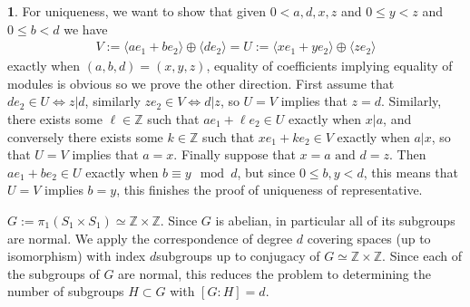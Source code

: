 \documentclass[10.5pt]{article}
\theoremstyle{definition}
\newtheorem{pb}{}
\newcommand{\gen}[1]{\langle #1 \rangle}
\newcommand{\tand}{\text{ and }}
\begin{document}
\begin{pb}
        For uniqueness, we want to show that given \(0 < a,d,x,z\) and \(0 \leq y < z\) and \(0 \leq b < d\) we have
        \begin{align*}
            V := \gen{ae_1 + be_2}\oplus\gen{de_2} = U := \gen{xe_1 + ye_2}\oplus\gen{ze_2}
        \end{align*}
        exactly when \((a,b,d) = (x,y,z)\), equality of coefficients implying equality of modules is obvious so we prove the other direction. First assume that \(d e_2 \in U \iff z \vert d\), similarly \(z e_2 \in V \iff d \vert z\), so \(U = V\) implies that \(z = d\). Similarly, there exists some \(\ell \in \mathbb{Z}\) such that \(ae_1 + \ell e_2 \in U\) exactly when \(x \vert a\), and conversely there exists some \(k \in \mathbb{Z}\) such that \(xe_1 + ke_2 \in V\) exactly when \(a \vert x\), so that \(U = V\) implies that \(a = x\). Finally suppose that \(x = a \tand d = z\). Then \(ae_1 + be_2 \in U\) exactly when \(b \equiv y \mod d\), but since \(0 \leq b,y < d\), this means that \(U = V\) implies \(b = y\), this finishes the proof of uniqueness of representative.
        \newline

        \(G := \pi_1(S_1 \times S_1) \simeq \mathbb{Z} \times \mathbb{Z}\). Since \(G\) is abelian, in particular all of its subgroups are normal. We apply the correspondence of degree \(d\) covering spaces (up to isomorphism) with index \(d\)subgroups up to conjugacy of \(G \simeq \mathbb{Z} \times \mathbb{Z}\). Since each of the subgroups of \(G\) are normal, this reduces the problem to determining the number of subgroups \(H \subset G\) with \([G:H] = d\).


\end{pb}
\end{document}
